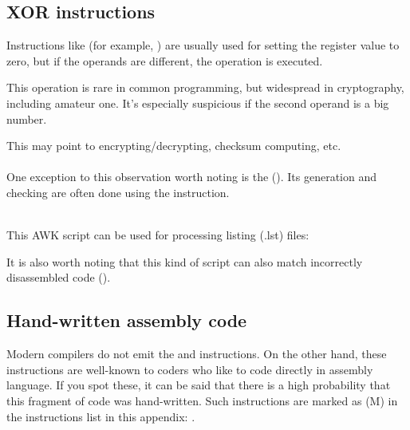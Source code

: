 
\subsection{XOR instructions}

Instructions like  (for example, ) 
are usually used for setting the register value
to zero, but if the operands are different, the  operation
is executed.

This operation is rare in common programming, but widespread in cryptography,
including amateur one.
It's especially suspicious if the
second operand is a big number.

This may point to encrypting/decrypting, checksum computing, etc.\\
\\

One exception to this observation worth noting is the  (). 
Its generation and checking are often done using the \XOR instruction. \\
\\

This AWK script can be used for processing \IDA{} listing (.lst) files:



It is also worth noting that this kind of script can also match incorrectly disassembled code 
().

\subsection{Hand-written assembly code}


Modern compilers do not emit the  and  instructions.
On the other hand, these instructions are well-known to coders who like to code directly in assembly language.
If you spot these, it can be said that there is a high probability that this fragment of code was hand-written.
Such instructions are marked as (M) in the instructions list in this appendix: .

\par

